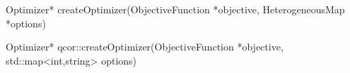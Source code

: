 \apisummary{
    
}

\begin{apidefinition}

\begin{Csynopsis}
    Optimizer* createOptimizer(ObjectiveFunction *objective, HeterogeneousMap *options)
\end{Csynopsis}

\begin{Cppsynopsis}
    Optimizer* qcor::createOptimizer(ObjectiveFunction *objective, std::map<int,string>  options)
\end{Cppsynopsis}


\begin{apiarguments}
\end{apiarguments}

\apidescription{
        
}


\apinotes{
    
}

\end{apidefinition}
